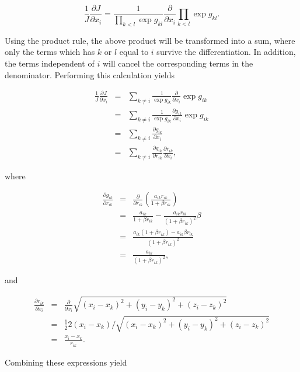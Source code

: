 \begin{equation}
 \frac{1}{J}\frac{\partial J}{\partial x_i} = \frac{1}{\prod_{k < l}\exp g_{kl}}\frac{\partial }{\partial x_i}\prod_{k < l}\exp g_{kl}.
\end{equation}

Using the product rule, the above product will be transformed into a sum, where only the terms which has $k$ or $l$ equal to $i$ survive the differentiation. In addition, the terms independent of $i$ will cancel the corresponding terms in the denominator. Performing this calculation yields

\begin{eqnarray}
  \frac{1}{J}\frac{\partial J}{\partial x_i} &=& \sum_{k \ne i} \frac{1}{\exp g_{ik}}\frac{\partial}{\partial x_i} \exp g_{ik} \nonumber\\
  &=& \sum_{k \ne i} \frac{1}{\exp g_{ik}}\frac{\partial g_{ik}}{\partial x_i} \exp g_{ik}\nonumber \\
  &=& \sum_{k \ne i} \frac{\partial g_{ik}}{\partial x_i} \nonumber \\
  &=& \sum_{k \ne i} \frac{\partial g_{ik}}{\partial r_{ik}}\frac{\partial r_{ik}}{\partial x_i},
\end{eqnarray}

where

\begin{eqnarray}
 \frac{\partial g_{ik}}{\partial r_{ik}} &=& \frac{\partial }{\partial r_{ik}} \left(\frac{a_{ik}r_{ik}}{1 + \beta r_{ik}}\right) \nonumber\\
  &=& \frac{a_{ik}}{1 + \beta r_{ik}} - \frac{a_{ik}r_{ik}}{(1 + \beta r_{ik})^2}\beta \nonumber \\
  &=& \frac{a_{ik}(1 + \beta r_{ik}) - a_{ik}\beta r_{ik}}{(1 + \beta r_{ik})^2}  \nonumber \\
  &=& \frac{a_{ik}}{(1 + \beta r_{ik})^2}, \label{eq:jastrowDgikDrik}
\end{eqnarray}

and

\begin{eqnarray}
 \frac{\partial r_{ik}}{\partial x_i} &=& \frac{\partial }{\partial x_i} \sqrt{(x_i - x_k)^2 + (y_i - y_k)^2 + (z_i - z_k)^2} \nonumber \\
  &=& \frac{1}{2} 2(x_i - x_k) / \sqrt{(x_i - x_k)^2 + (y_i - y_k)^2 + (z_i - z_k)^2} \nonumber \\
  &=& \frac{x_i - x_k}{r_{ik}}.
\end{eqnarray}

Combining these expressions yield

